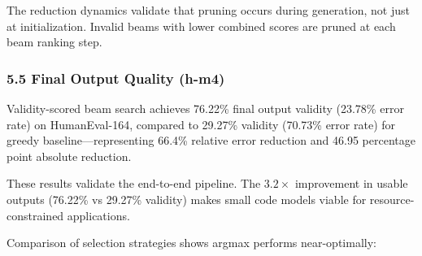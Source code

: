 The reduction dynamics validate that pruning occurs during generation, not just at initialization. Invalid beams with lower combined scores are pruned at each beam ranking step.

\subsubsection{5.5 Final Output Quality (h-m4)}

Validity-scored beam search achieves 76.22\% final output validity (23.78\% error rate) on HumanEval-164, compared to 29.27\% validity (70.73\% error rate) for greedy baseline---representing 66.4\% relative error reduction and 46.95 percentage point absolute reduction.

\begin{table}[htbp]
\centering
{}
\end{table}

These results validate the end-to-end pipeline. The 3.$2\times$ improvement in usable outputs (76.22\% vs 29.27\% validity) makes small code models viable for resource-constrained applications.

Comparison of selection strategies shows argmax performs near-optimally:

\begin{table}[htbp]
\centering
{}
\end{table}

